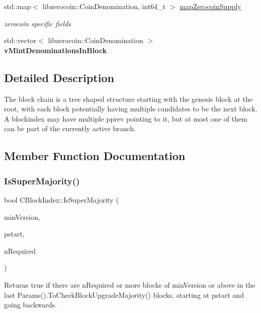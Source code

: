 \begin{DoxyCompactItemize}
std\+::map$<$ libzerocoin\+::\+Coin\+Denomination, int64\+\_\+t $>$ \mbox{\hyperlink{class_c_block_index_a0a25aebf3adf907ea8847e7a108d8225}{map\+Zerocoin\+Supply}}
\begin{DoxyCompactList}\small\item\em zerocoin specific fields \end{DoxyCompactList}\item 
\mbox{\label{class_c_block_index_a7337ba7a13a51b7f200b352caf074eb1}} 
std\+::vector$<$ libzerocoin\+::\+Coin\+Denomination $>$ {\bfseries v\+Mint\+Denominations\+In\+Block}
\end{DoxyCompactItemize}


\subsection{Detailed Description}
The block chain is a tree shaped structure starting with the genesis block at the root, with each block potentially having multiple candidates to be the next block. A blockindex may have multiple pprev pointing to it, but at most one of them can be part of the currently active branch. 

\subsection{Member Function Documentation}
\mbox{\label{class_c_block_index_a96fbd9608432d92c27d4314f32341988}} 
\subsubsection{\texorpdfstring{IsSuperMajority()}{IsSuperMajority()}}
{\footnotesize\ttfamily bool C\+Block\+Index\+::\+Is\+Super\+Majority (\begin{DoxyParamCaption}\item[{int}]{min\+Version,  }\item[{const \mbox{\hyperlink{class_c_block_index}{C\+Block\+Index}} $\ast$}]{pstart,  }\item[{unsigned int}]{n\+Required }\end{DoxyParamCaption})\hspace{0.3cm}{\ttfamily [static]}}

Returns true if there are n\+Required or more blocks of min\+Version or above in the last Params().To\+Check\+Block\+Upgrade\+Majority() blocks, starting at pstart and going backwards. \mbox{\label{class_c_block_index_a076aff906933e9d75a37aa9b81c01384}} 
